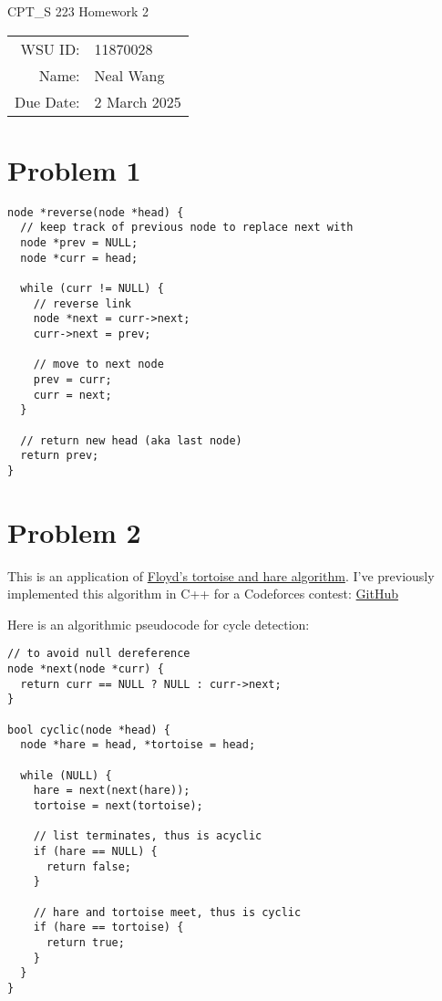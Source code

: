 \documentclass[12pt]{article}
\theoremstyle{definition}
\begin{document}
\begin{center}
  {\Large CPT\_S 223 Homework 2}
  $ $\\
  $ $\\
  \begin{tabular}{rl}
    WSU ID: & 11870028 \\
    Name: & Neal Wang \\
    Due Date: & 2 March 2025
  \end{tabular}
\end{center}

\section{Problem 1}

\begin{verbatim}
node *reverse(node *head) {
  // keep track of previous node to replace next with
  node *prev = NULL;
  node *curr = head;

  while (curr != NULL) {
    // reverse link
    node *next = curr->next;
    curr->next = prev;

    // move to next node
    prev = curr;
    curr = next;
  }

  // return new head (aka last node)
  return prev;
}
\end{verbatim}

\newpage

\section{Problem 2}

This is an application of
\href{https://en.wikipedia.org/wiki/Cycle_detection#Floyd's_tortoise_and_hare}
{Floyd's tortoise and hare algorithm}. I've previously implemented
this algorithm in C++ for a Codeforces contest:
\href{https://github.com/mathletedev/cp/blob/main/Codeforces/1137D.cpp}{GitHub}

Here is an algorithmic pseudocode for cycle detection:

\begin{verbatim}
// to avoid null dereference
node *next(node *curr) {
  return curr == NULL ? NULL : curr->next;
}

bool cyclic(node *head) {
  node *hare = head, *tortoise = head;

  while (NULL) {
    hare = next(next(hare));
    tortoise = next(tortoise);

    // list terminates, thus is acyclic
    if (hare == NULL) {
      return false;
    }

    // hare and tortoise meet, thus is cyclic
    if (hare == tortoise) {
      return true;
    }
  }
}
\end{verbatim}
\end{document}
